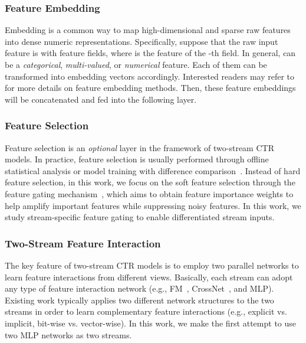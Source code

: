 \documentclass[letterpaper]{article} \usepackage{aaai23}  \usepackage{times}  \usepackage{helvet}  \usepackage{courier}  \usepackage[hyphens]{url}  \usepackage{graphicx} \urlstyle{rm} \def\UrlFont{\rm}  \usepackage{natbib}  \usepackage{caption} \frenchspacing  \setlength{\pdfpagewidth}{8.5in}  \setlength{\pdfpageheight}{11in}  \usepackage{algorithm}
\begin{document}
\subsubsection{\textbf{Feature Embedding}}
Embedding is a common way to map high-dimensional and sparse raw features into dense numeric representations. Specifically, suppose that the raw input feature is  with  feature fields, where  is the feature of the -th field. In general,  can be a \textit{categorical}, \textit{multi-valued}, or \textit{numerical} feature. Each of them can be transformed into embedding vectors accordingly. Interested readers may refer to~\cite{fuxictr} for more details on feature embedding methods. Then, these feature embeddings will be concatenated and fed into the following layer.











\subsubsection{\textbf{Feature Selection}}
Feature selection is an \textit{optional} layer in the framework of two-stream CTR models. In practice, feature selection is usually performed through offline statistical analysis or model training with difference comparison~\cite{FeatureSelection}. Instead of hard feature selection, in this work, we focus on the soft feature selection through the feature gating mechanism~\cite{FiBiNET,FeatureGating}, which aims to obtain feature importance weights to help amplify important features while suppressing noisy features. In this work, we study stream-specific feature gating to enable differentiated stream inputs.


\subsubsection{\textbf{Two-Stream Feature Interaction}}
\label{sec:fusion_layer}
The key feature of two-stream CTR models is to employ two parallel networks to learn feature interactions from different views. Basically, each stream can adopt any type of feature interaction network (e.g., FM~\cite{FM}, CrossNet~\cite{DCN}, and MLP). Existing work typically applies two different network structures to the two streams in order to learn complementary feature interactions (e.g., explicit vs. implicit, bit-wise vs. vector-wise). In this work, we make the first attempt to use two MLP networks as two streams.
\end{document}
